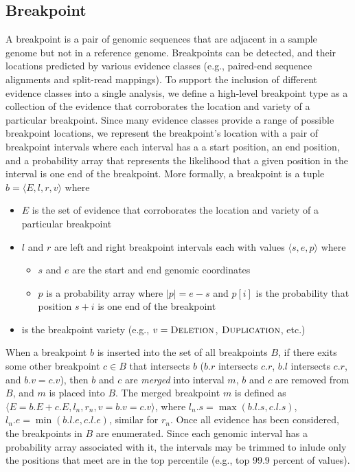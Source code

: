 \documentclass[11pt]{article}
\begin{document}
\subsection{Breakpoint}

A breakpoint is a pair of genomic sequences that are adjacent in a sample genome
but not in a reference genome. Breakpoints can be detected, and their locations
predicted by various evidence classes (e.g., paired-end sequence alignments and
split-read mappings).  To support the inclusion of different evidence classes
into a single analysis, we define a high-level breakpoint type as a collection
of the evidence that corroborates the location and variety of a particular
breakpoint.  Since many evidence classes provide a range of possible breakpoint
locations, we represent the breakpoint's location with a pair of breakpoint
intervals where each interval has a a start position, an end position, and a
probability array that represents the likelihood that a given position in the
interval is one end of the breakpoint.  More formally, a breakpoint is a tuple 
$b=\langle E,l,r,v \rangle$ where
\begin{itemize}
\item $E$ is the set of evidence that corroborates the location and variety of a
particular breakpoint
\item $l$ and $r$ are left and right breakpoint intervals each with values
	$\langle s, e, p \rangle$ where
	\begin{itemize}
		\item $s$ and $e$ are the start and end genomic coordinates
		\item $p$ is a probability array where $|p|=e-s$ and $p[i]$ is the
		probability that position $s+i$ is one end of the breakpoint
	\end{itemize}
\item  is the breakpoint variety (e.g., $v=\textsc{Deletion}$,
$\textsc{Duplication}$, etc.)
\end{itemize}

When a breakpoint $b$ is inserted into the set of all breakpoints $B$, if there
exits some other breakpoint $c \in B$ that intersects $b$ ($b.r$
intersects $c.r$, $b.l$ intersects $c.r$, and $b.v = c.v$), then $b$ and $c$
are {\em merged} into interval $m$, $b$ and $c$ are removed from $B$, and $m$ is
placed into $B$.  The merged breakpoint $m$ is defined as
$\langle E = b.E + c.E, l_n, r_n, v = b.v = c.v\rangle$, where 
$l_n.s = \max(b.l.s, c.l.s)$, $l_n.e = \min(b.l.e, c.l.e)$, similar for 
$r_n$.  Once all evidence has been considered, the breakpoints in $B$ are
enumerated.  Since each genomic interval has a probability array associated with
it, the intervals may be trimmed to inlude only the positions that meet are
in the top percentile (e.g., top 99.9 percent of values).
\end{document}
